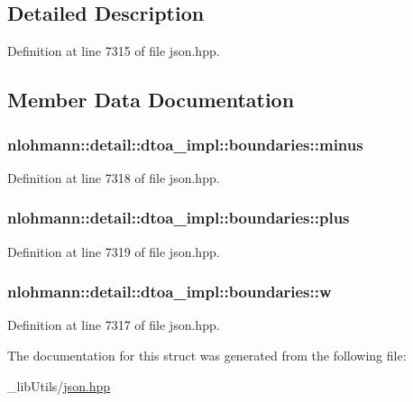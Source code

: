 \subsection{Detailed Description}


Definition at line 7315 of file json.\+hpp.



\subsection{Member Data Documentation}
\subsubsection[{\texorpdfstring{minus}{minus}}]{ nlohmann\+::detail\+::dtoa\+\_\+impl\+::boundaries\+::minus}\hypertarget{structnlohmann_1_1detail_1_1dtoa__impl_1_1boundaries_aec4e5028333c01f3229062f31ce16763}{}\label{structnlohmann_1_1detail_1_1dtoa__impl_1_1boundaries_aec4e5028333c01f3229062f31ce16763}


Definition at line 7318 of file json.\+hpp.

\subsubsection[{\texorpdfstring{plus}{plus}}]{ nlohmann\+::detail\+::dtoa\+\_\+impl\+::boundaries\+::plus}\hypertarget{structnlohmann_1_1detail_1_1dtoa__impl_1_1boundaries_a3321ae2816a6ec5250a0d8e29f798232}{}\label{structnlohmann_1_1detail_1_1dtoa__impl_1_1boundaries_a3321ae2816a6ec5250a0d8e29f798232}


Definition at line 7319 of file json.\+hpp.

\subsubsection[{\texorpdfstring{w}{w}}]{ nlohmann\+::detail\+::dtoa\+\_\+impl\+::boundaries\+::w}\hypertarget{structnlohmann_1_1detail_1_1dtoa__impl_1_1boundaries_ad1668c60aeade5f2557fafed8b8aee1a}{}\label{structnlohmann_1_1detail_1_1dtoa__impl_1_1boundaries_ad1668c60aeade5f2557fafed8b8aee1a}


Definition at line 7317 of file json.\+hpp.



The documentation for this struct was generated from the following file\+:\begin{DoxyCompactItemize}
\item 
\+\_\+lib\+Utils/\hyperlink{json_8hpp}{json.\+hpp}\end{DoxyCompactItemize}
